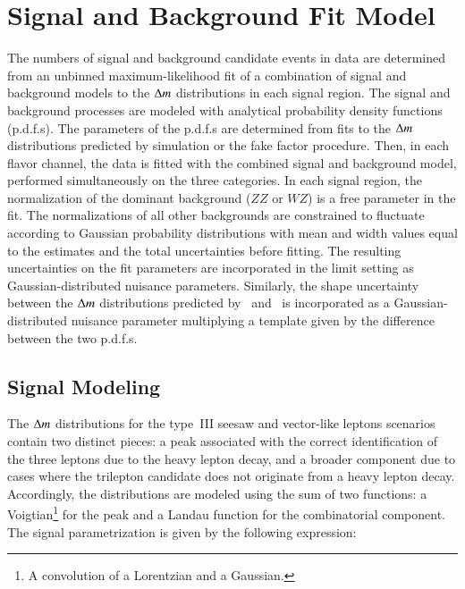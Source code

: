 \section{Signal and Background Fit Model}\label{sec:resonance-fit-method}
The numbers of signal and background candidate events in data are determined from an unbinned maximum-likelihood fit of a combination of signal and background models to the $\Delta m$ distributions in each signal region. The signal and background processes are modeled with analytical probability density functions (p.d.f.s). The parameters of the p.d.f.s are determined from fits to the $\Delta m$ distributions predicted by simulation or the fake factor procedure. Then, in each flavor channel, the data is fitted with the combined signal and background model, performed simultaneously on the three categories. In each signal region, the normalization of the dominant background ($ZZ$ or $WZ$) is a free parameter in the fit. The normalizations of all other backgrounds are constrained to fluctuate according to Gaussian probability distributions with mean and width values equal to the estimates and the total uncertainties before fitting. The resulting uncertainties on the fit parameters are incorporated in the limit setting as Gaussian-distributed nuisance parameters. Similarly, the shape uncertainty between the $\Delta m$ distributions predicted by \sherpa\ and \powheg\ is incorporated as a Gaussian-distributed nuisance parameter multiplying a template given by the difference between the two p.d.f.s.

\subsection{Signal Modeling}\label{sec:resonance-signal-model}
The $\Delta m$ distributions for the type~III seesaw and vector-like leptons scenarios contain two distinct pieces: a peak associated with the correct identification of the three leptons due to the heavy lepton decay, and a broader component due to cases where the trilepton candidate does not originate from a heavy lepton decay. Accordingly, the distributions are modeled using the sum of two functions: a Voigtian\footnote{A convolution of a Lorentzian and a Gaussian.} for the peak and a Landau function for the combinatorial component.  The signal parametrization is given by the following expression: 

